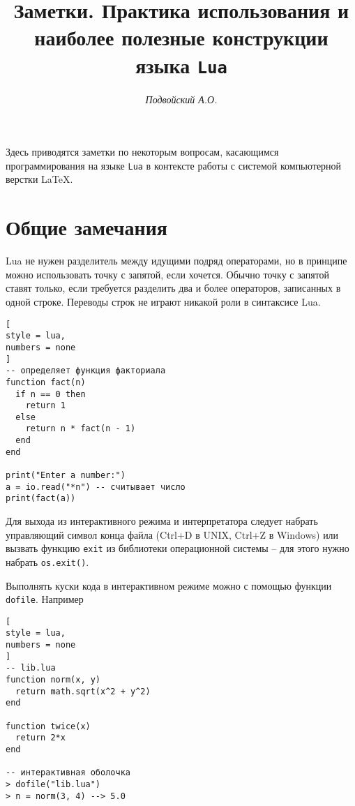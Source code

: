\documentclass[%
	11pt,
	a4paper,
	utf8,
		]{article}
\begin{document}
\title{Заметки. Практика использования и наиболее полезные конструкции языка \texttt{Lua}}

\author{\itshape Подвойский А.О.}

\date{}
\maketitle

\thispagestyle{fancy}

Здесь приводятся заметки по некоторым вопросам, касающимся программирования на языке \texttt{Lua} в контексте работы с системой компьютерной верстки \LaTeX.




\section{Общие замечания}

Lua не нужен разделитель между идущими подряд операторами, но в принципе можно использовать точку с запятой, если хочется. Обычно точку с запятой ставят только, если требуется разделить два и более операторов, записанных в одной строке. Переводы строк не играют никакой роли в синтаксисе Lua.

\begin{lstlisting}[
style = lua,
numbers = none	
]
-- определяет функция факториала
function fact(n)
  if n == 0 then
    return 1
  else
    return n * fact(n - 1)
  end
end

print("Enter a number:")
a = io.read("*n") -- считывает число
print(fact(a))
\end{lstlisting}

Для выхода из интерактивного режима и интерпретатора следует набрать управляющий символ конца файла (\textsf{Ctrl+D} в UNIX, \textsf{Ctrl+Z} в Windows) или вызвать функцию \texttt{exit} из библиотеки операционной системы -- для этого нужно набрать \texttt{os.exit()}.

Выполнять куски кода в интерактивном режиме можно с помощью функции \texttt{dofile}. Например
\begin{lstlisting}[
style = lua,
numbers = none	
]
-- lib.lua
function norm(x, y)
  return math.sqrt(x^2 + y^2)
end

function twice(x)
  return 2*x
end

-- интерактивная оболочка
> dofile("lib.lua")
> n = norm(3, 4) --> 5.0
\end{lstlisting}
\end{document}
